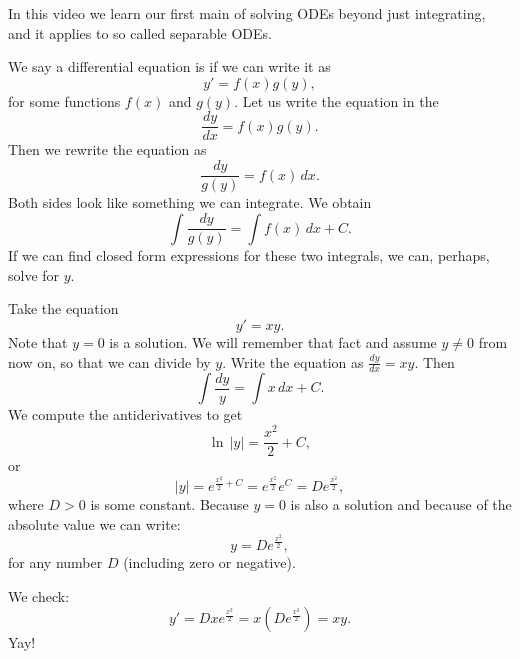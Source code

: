 \begin{video}
	In this video we learn our first main of solving ODEs beyond just integrating, and it applies to so called separable ODEs.
\end{video}

We say a differential equation is
\emph{}
if we can write it as
\begin{equation*}
y' = f(x)g(y) ,
\end{equation*}
for some functions $f(x)$ and $g(y)$.
Let us write the equation in the 
\begin{equation*}
\frac{dy}{dx} = f(x)g(y) .
\end{equation*}
Then we rewrite the equation as
\begin{equation*}
\frac{dy}{g(y)} = f(x) \,dx .
\end{equation*}
Both sides look like something we can integrate.  We obtain
\begin{equation*}
\int \frac{dy}{g(y)} = \int f(x) \,dx + C .
\end{equation*}
If we can find closed form expressions
for these two integrals, we can, perhaps, solve for $y$.

\begin{example} \label{example:yprimeisxy}
Take the equation
\begin{equation*}
y' = xy .
\end{equation*}
Note that $y=0$ is a solution.  We will remember that fact and
assume $y \not =0$ from now on, so that we can divide by $y$.
Write the equation as $\frac{dy}{dx} = xy$. Then
\begin{equation*}
\int \frac{dy}{y} = \int x\,dx + C .
\end{equation*}
We compute the antiderivatives to get
\begin{equation*}
\ln \, \lvert y\rvert = \frac{x^2}{2} + C ,
\end{equation*}
or
\begin{equation*}
\lvert y \rvert = e^{\frac{x^2}{2} + C} = e^{\frac{x^2}{2}} e^C = D e^{\frac{x^2}{2}} ,
\end{equation*}
where $D > 0$ is some constant.  Because $y=0$ is also a solution and because
of the absolute value we can write:
\begin{equation*}
y = D e^{\frac{x^2}{2}} ,
\end{equation*}
for any number $D$ (including zero or negative).

We check:
\begin{equation*}
y' = D x e^{\frac{x^2}{2}} = x \left( D e^{\frac{x^2}{2}} \right) = xy .
\end{equation*}
Yay!
\end{example}

